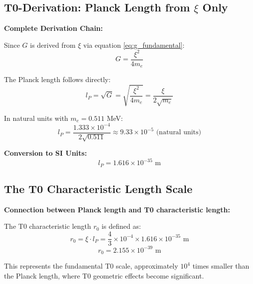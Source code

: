 \documentclass[12pt,a4paper]{article}
\begin{document}
	\subsection{T0-Derivation: Planck Length from $\xi$ Only}
	
	\begin{keyresult}
		\textbf{Complete Derivation Chain:}
		
		Since $G$ is derived from $\xi$ via equation \eqref{eq:g_fundamental}:
		\begin{equation}
			G = \frac{\xi^2}{4 m_e}
		\end{equation}
		
		The Planck length follows directly:
		\begin{equation}
			l_P = \sqrt{G} = \sqrt{\frac{\xi^2}{4 m_e}} = \frac{\xi}{2\sqrt{m_e}}
		\end{equation}
		
		In natural units with $m_e = 0.511$ MeV:
		\begin{equation}
			l_P = \frac{1.333 \times 10^{-4}}{2\sqrt{0.511}} \approx 9.33 \times 10^{-5} \text{ (natural units)}
		\end{equation}
		
		\textbf{Conversion to SI Units:}
		\begin{equation}
			\boxed{l_P = 1.616 \times 10^{-35} \text{ m}}
		\end{equation}
	\end{keyresult}
	
	\subsection{The T0 Characteristic Length Scale}
	
	\begin{insight}
		\textbf{Connection between Planck length and T0 characteristic length:}
		
		The T0 characteristic length $r_0$ is defined as:
		\begin{equation}
			r_0 = \xi \cdot l_P = \frac{4}{3} \times 10^{-4} \times 1.616 \times 10^{-35} \text{ m}
		\end{equation}
		\begin{equation}
			\boxed{r_0 = 2.155 \times 10^{-39} \text{ m}}
		\end{equation}
		
		This represents the fundamental T0 scale, approximately $10^4$ times smaller than the Planck length, where T0 geometric effects become significant.
	\end{insight}
	
\end{document}
